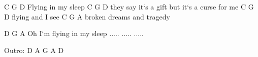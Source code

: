     C   G        D
    Flying in my sleep
         C              G                     D
    they say it`s a gift but it`s a curse for me
    C   G        D
    flying and I see
    C      G            A
    broken dreams and tragedy

           D            G      A
    Oh I`m flying in my sleep
    .....
    .....
    .....


    Outro: D A G A D

